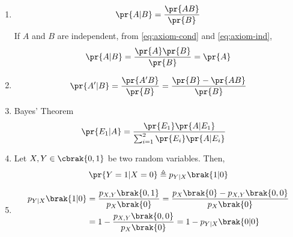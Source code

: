 \begin{enumerate}[label=\thesubsection.\arabic*,ref=\thesubsection.\theenumi]
\item 
\begin{align}
	\pr{A | B} = \frac{\pr{AB}}{\pr{B}}
\label{eq:axiom-cond}
\end{align}
If $A$ and $B$ are independent, from 
\eqref{eq:axiom-cond}
and 
\eqref{eq:axiom-ind},
\begin{align}
	\pr{A | B} = \frac{\pr{A}\pr{B}}{\pr{B}}={\pr{A}}
\label{eq:axiom-cond-ind}
\end{align}
\item 
\begin{align}
	\pr{A' | B} = \frac{\pr{A'B}}{\pr{B}} = \frac{\pr{B}-\pr{AB}}{\pr{B}}
\label{eq:axiom-cond-prime}
\end{align}
\item Bayes' Theorem
\begin{align}
	\pr{E_1|A} &= \frac{\pr{E_1}\pr{A|E_1}}{\sum_{i=1}^{2}\pr{E_i}\pr{A|E_i}}
\label{eq:axiom-bayes}
\end{align}
\item Let $X, Y \in \cbrak{0,1}$ be two random variables.  Then, 
\begin{align}
	\label{eq:12/13/3/43/yixj-def}
	  \pr{Y=1|X=0}\triangleq  p_{Y|X}\brak{1|0}
\end{align}
\item 
\begin{align}
	   p_{Y|X}\brak{1|0}
	   &=
	   \frac{p_{X,Y}\brak{0,1}}{p_{X}\brak{0}}
	   =
	   \frac{p_{X}\brak{0}-p_{X,Y}\brak{0,0}}{p_{X}\brak{0}}
	   \\
	   &=
	   1-\frac{p_{X,Y}\brak{0,0}}{p_{X}\brak{0}} = 1-p_{Y|X}\brak{0|0}
	\label{eq:12/13/3/43/yixj}
\end{align}
\end{enumerate}
